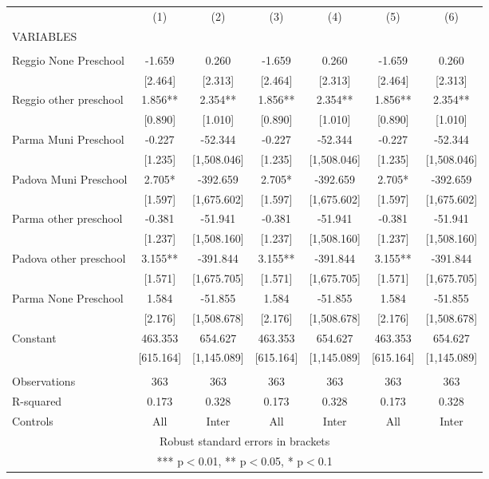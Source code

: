 \begin{tabular}{lcccccc} \hline
 & (1) & (2) & (3) & (4) & (5) & (6) \\
VARIABLES &  &  &  &  &  &  \\ \hline
 &  &  &  &  &  &  \\
Reggio None Preschool & -1.659 & 0.260 & -1.659 & 0.260 & -1.659 & 0.260 \\
 & [2.464] & [2.313] & [2.464] & [2.313] & [2.464] & [2.313] \\
Reggio other preschool & 1.856** & 2.354** & 1.856** & 2.354** & 1.856** & 2.354** \\
 & [0.890] & [1.010] & [0.890] & [1.010] & [0.890] & [1.010] \\
Parma Muni Preschool & -0.227 & -52.344 & -0.227 & -52.344 & -0.227 & -52.344 \\
 & [1.235] & [1,508.046] & [1.235] & [1,508.046] & [1.235] & [1,508.046] \\
Padova Muni Preschool & 2.705* & -392.659 & 2.705* & -392.659 & 2.705* & -392.659 \\
 & [1.597] & [1,675.602] & [1.597] & [1,675.602] & [1.597] & [1,675.602] \\
Parma other preschool & -0.381 & -51.941 & -0.381 & -51.941 & -0.381 & -51.941 \\
 & [1.237] & [1,508.160] & [1.237] & [1,508.160] & [1.237] & [1,508.160] \\
Padova other preschool & 3.155** & -391.844 & 3.155** & -391.844 & 3.155** & -391.844 \\
 & [1.571] & [1,675.705] & [1.571] & [1,675.705] & [1.571] & [1,675.705] \\
Parma None Preschool & 1.584 & -51.855 & 1.584 & -51.855 & 1.584 & -51.855 \\
 & [2.176] & [1,508.678] & [2.176] & [1,508.678] & [2.176] & [1,508.678] \\
Constant & 463.353 & 654.627 & 463.353 & 654.627 & 463.353 & 654.627 \\
 & [615.164] & [1,145.089] & [615.164] & [1,145.089] & [615.164] & [1,145.089] \\
 &  &  &  &  &  &  \\
Observations & 363 & 363 & 363 & 363 & 363 & 363 \\
R-squared & 0.173 & 0.328 & 0.173 & 0.328 & 0.173 & 0.328 \\
 Controls & All & Inter & All & Inter & All & Inter \\ \hline
\multicolumn{7}{c}{ Robust standard errors in brackets} \\
\multicolumn{7}{c}{ *** p$<$0.01, ** p$<$0.05, * p$<$0.1} \\
\end{tabular}
